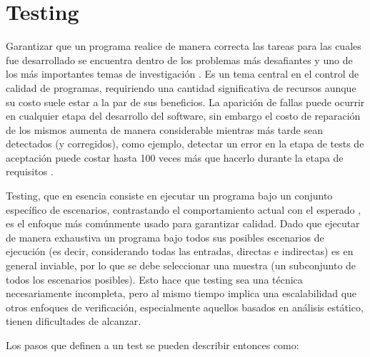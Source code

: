\chapter[Testing]{Testing}
\label{sec:preliminares.testing}

Garantizar que un programa realice de manera correcta las tareas para las cuales fue desarrollado se encuentra dentro de los problemas m\'as desafiantes y uno de los m\'as importantes temas de investigaci\'on \cite{bibliography.books.GhezziBook,bibliography.books.PressmanBook,bibliography.books.JaloteBook}. Es un tema central en el control de calidad de programas, requiriendo una cantidad significativa de recursos \cite{bibliography.books.JaloteBook} aunque su costo suele estar a la par de sus beneficios. La aparici\'on de fallas puede ocurrir en cualquier etapa del desarrollo del software, sin embargo el costo de reparaci\'on de los mismos aumenta de manera considerable mientras m\'as tarde sean detectados (y corregidos), como ejemplo, detectar un error en la etapa de tests de aceptaci\'on puede costar hasta 100 veces m\'as que hacerlo durante la etapa de requisitos \cite{bibliography.books.JaloteBook}.

Testing, que en esencia consiste en ejecutar un programa bajo un conjunto espec\'ifico de escenarios, contrastando el comportamiento actual con el esperado \cite{bibliography.books.AmmannOffutt}, es el enfoque m\'as com\'unmente usado para garantizar calidad. Dado que ejecutar de manera exhaustiva un programa bajo todos sus posibles escenarios de ejecuci\'on (es decir, considerando todas las entradas, directas e indirectas) es en general inviable, por lo que se debe seleccionar una muestra (un subconjunto de todos los escenarios posibles). Esto hace que testing sea una t\'ecnica necesariamente incompleta, pero al mismo tiempo implica una escalabilidad que otros enfoques de verificaci\'on, especialmente aquellos basados en an\'alisis est\'atico, tienen dificultades de alcanzar.

Los pasos que definen a un test se pueden describir entonces como:

